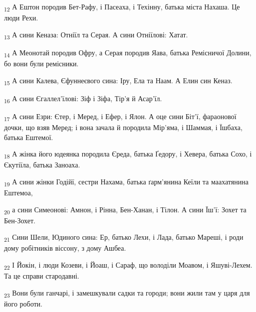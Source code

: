\begin{tcolorbox}
\textsubscript{12} А Ештон породив Бет-Рафу, і Пасеаха, і Техінну, батька міста Нахаша. Це люди Рехи.
\end{tcolorbox}
\begin{tcolorbox}
\textsubscript{13} А сини Кеназа: Отніїл та Серая. А сини Отніїлові: Хатат.
\end{tcolorbox}
\begin{tcolorbox}
\textsubscript{14} А Меонотай породив Офру, а Серая породив Яава, батька Ремісничої Долини, бо вони були ремісники.
\end{tcolorbox}
\begin{tcolorbox}
\textsubscript{15} А сини Калева, Єфуннеєвого сина: Іру, Ела та Наам. А Елин син Кеназ.
\end{tcolorbox}
\begin{tcolorbox}
\textsubscript{16} А сини Єгаллел'їлові: Зіф і Зіфа, Тір'я й Асар'їл.
\end{tcolorbox}
\begin{tcolorbox}
\textsubscript{17} А сини Езри: Єтер, і Меред, і Ефер, і Ялон. А оце сини Біт'ї, фараонової дочки, що взяв Меред; і вона зачала й породила Мір'яма, і Шаммая, і Їшбаха, батька Ештемої.
\end{tcolorbox}
\begin{tcolorbox}
\textsubscript{18} А жінка його юдеянка породила Єреда, батька Ґедору, і Хевера, батька Сохо, і Єкутіїла, батька Заноаха.
\end{tcolorbox}
\begin{tcolorbox}
\textsubscript{19} А сини жінки Годійї, сестри Нахама, батька ґарм'янина Кеїли та маахатянина Ештемоа,
\end{tcolorbox}
\begin{tcolorbox}
\textsubscript{20} а сини Симеонові: Амнон, і Рінна, Бен-Ханан, і Тілон. А сини Їш'ї: Зохет та Бен-Зохет.
\end{tcolorbox}
\begin{tcolorbox}
\textsubscript{21} Сини Шели, Юдиного сина: Ер, батько Лехи, і Лада, батько Мареші, і роди дому робітників віссону, з дому Ашбеа.
\end{tcolorbox}
\begin{tcolorbox}
\textsubscript{22} І Йокін, і люди Козеви, і Йоаш, і Сараф, що володіли Моавом, і Яшуві-Лехем. Та це справи стародавні.
\end{tcolorbox}
\begin{tcolorbox}
\textsubscript{23} Вони були ганчарі, і замешкували садки та городи; вони жили там у царя для його роботи.
\end{tcolorbox}
